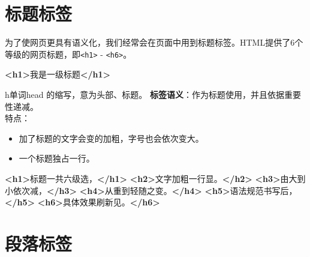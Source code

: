 \documentclass[
]{book}
\newenvironment{Shaded}{\begin{snugshade}}{\end{snugshade}}
\newcommand{\KeywordTok}[1]{\textcolor[rgb]{0.13,0.29,0.53}{\textbf{#1}}}
\newcommand{\NormalTok}[1]{#1}
\providecommand{\tightlist}{%
  \setlength{\itemsep}{0pt}\setlength{\parskip}{0pt}}
\begin{document}
\hypertarget{ux6807ux9898ux6807ux7b7e}{%
\section{标题标签}\label{ux6807ux9898ux6807ux7b7e}}

为了使网页更具有语义化，我们经常会在页面中用到标题标签。HTML提供了6个等级的网页标题，即\texttt{\textless{}h1\textgreater{}} - \texttt{\textless{}h6\textgreater{}}。

\begin{Shaded}
\begin{Highlighting}[]
\KeywordTok{\textless{}h1\textgreater{}}\NormalTok{我是一级标题}\KeywordTok{\textless{}/h1\textgreater{}}
\end{Highlighting}
\end{Shaded}

h单词head 的缩写，意为头部、标题。
\textbf{标签语义}：作为标题使用，并且依据重要性递减。\\
特点：

\begin{itemize}
\tightlist
\item
  加了标题的文字会变的加粗，字号也会依次变大。
\item
  一个标题独占一行。
\end{itemize}

\begin{Shaded}
\begin{Highlighting}[]
\KeywordTok{\textless{}h1\textgreater{}}\NormalTok{标题一共六级选，}\KeywordTok{\textless{}/h1\textgreater{}}
\KeywordTok{\textless{}h2\textgreater{}}\NormalTok{文字加粗一行显。}\KeywordTok{\textless{}/h2\textgreater{}}
\KeywordTok{\textless{}h3\textgreater{}}\NormalTok{由大到小依次减，}\KeywordTok{\textless{}/h3\textgreater{}}
\KeywordTok{\textless{}h4\textgreater{}}\NormalTok{从重到轻随之变。}\KeywordTok{\textless{}/h4\textgreater{}}
\KeywordTok{\textless{}h5\textgreater{}}\NormalTok{语法规范书写后，}\KeywordTok{\textless{}/h5\textgreater{}}
\KeywordTok{\textless{}h6\textgreater{}}\NormalTok{具体效果刷新见。}\KeywordTok{\textless{}/h6\textgreater{}}
\end{Highlighting}
\end{Shaded}

\hypertarget{ux6bb5ux843dux6807ux7b7e}{%
\section{段落标签}\label{ux6bb5ux843dux6807ux7b7e}}
\end{document}
